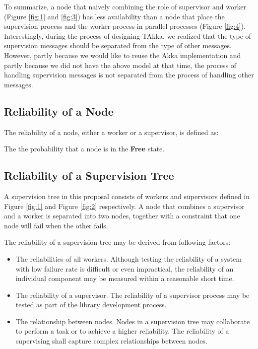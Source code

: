 \documentclass[12pt, authoryear]{article}
\begin{document}
To summarize, a node that naively combining the role of supervisor and worker 
(Figure \ref{fig:1} and \ref{fig:3}) has less availability than a node that 
place the supervision process and the worker process in parallel processes 
(Figure \ref{fig:4}).  Interestingly, during the process of designing TAkka, we 
realized that the type of supervision messages should be separated 
from the type of other messages.  However, partly because we would like to 
reuse the Akka implementation and partly because we did not have the above 
model at that time, the process of handling supervision messages is not 
separated from the process of handling other messages.


\subsection{Reliability of a Node}

The reliability of a node, either a worker or a supervisor, is defined as:

The the probability that a node is in the {\bf Free} state.


\subsection{Reliability of a Supervision Tree}

A supervision tree in this proposal consists of workers and supervisors defined 
in Figure \ref{fig:1} and Figure \ref{fig:2} respectively.  A node that 
combines a supervisor and a worker is separated into two nodes, together with a 
constraint that one node will fail when the other fails.

The reliability of a supervision tree may be derived from following factors:

\begin{itemize}
  \item The reliabilities of all workers.  Although testing the reliability of 
a system with low failure rate is difficult or even impractical, the 
reliability of an individual component may be measured within a reasonable 
short time. 
  \item The reliability of a supervisor.  The reliability of a supervisor 
process may be tested as part of the library development process.
  \item The relationship between nodes.  Nodes in a supervision tree may 
collaborate to perform a task or to achieve a higher reliability. The 
reliability of a supervising shall capture complex relationships 
between nodes.
\end{itemize}
\end{document}
